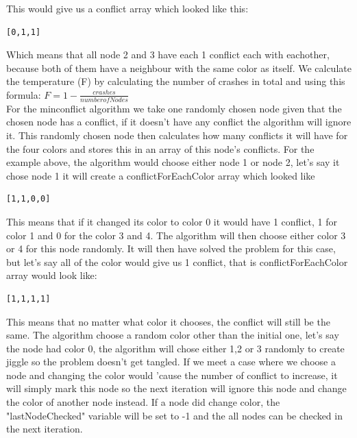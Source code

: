 \documentclass[12pt, a4paper]{article}
\begin{document}
This would give us a conflict array which looked like this:
\begin{center}
\begin{verbatim}
[0,1,1]
\end{verbatim}
\end{center}
Which means that all node 2 and 3 have each 1 conflict each with eachother, because both of them have a neighbour with the same color as itself. We calculate the temperature (F) by calculating the number of crashes in total and using this formula: $F = 1- \frac{crashes}{number of Nodes}$ \\
For the minconflict algorithm we take one randomly chosen node given that the chosen node has a conflict, if it doesn't have any conflict the algorithm will ignore it. This randomly chosen node then calculates how many conflicts it will have for the four colors and stores this in an array of this node's conflicts. For the example above, the algorithm would choose either node 1 or node 2, let's say it chose node 1 it will create a conflictForEachColor array which looked like
\begin{verbatim}
[1,1,0,0]
\end{verbatim} 
This means that if it changed its color to color 0 it would have 1 conflict, 1 for color 1 and 0 for the color 3 and 4. The algorithm will then choose either color 3 or 4 for this node randomly. It will then have solved the problem for this case, but let's say all of the color would give us 1 conflict, that is conflictForEachColor array would look like:
\begin{verbatim}
[1,1,1,1]
\end{verbatim}
This means that no matter what color it chooses, the conflict will still be the same. The algorithm choose a random color other than the initial one, let's say the node had color 0, the algorithm will chose either 1,2 or 3 randomly to create jiggle so the problem doesn't get tangled.
If we meet a case where we choose a node and changing the color would 'cause the number of conflict to increase, it will simply mark this node so the next iteration will ignore this node and change the color of another node instead. If a node did change color, the "lastNodeChecked" variable will be set to -1 and the all nodes can be checked in the next iteration.
\end{document}
